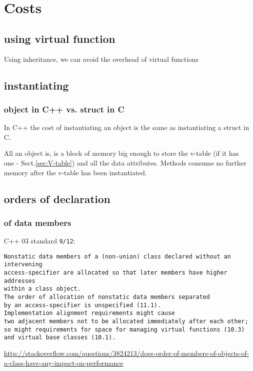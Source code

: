 \chapter{Costs}


\section{using virtual function}
\label{sec:overhead-of-virtual-function}


Using inheritance, we can avoid the overhead of virtual functions


\section{instantiating}
\label{sec:overhead-of-instantiating}

\subsection{object in C++ vs. struct in C}
\label{sec:overhead-of-instantiating-object_in_C++-vs_struct_in_C}

In C++ the cost of instantiating an object is the same as instantiating a struct
in C.

All an object is, is a block of memory big enough to store the v-table (if it
has one - Sect.\ref{sec:V-table}) and all the data attributes. Methods consume
no further memory after the v-table has been instantiated.

\section{orders of declaration}
\label{sec:overhead-of-order-of-declaration}


\subsection{of data members}
\label{sec:overhead-of-order-of-declaration-data-members}

C++ 03 standard \verb!9/12!:
\begin{verbatim}
Nonstatic data members of a (non-union) class declared without an intervening
access-specifier are allocated so that later members have higher addresses 
within a class object. 
The order of allocation of nonstatic data members separated 
by an access-specifier is unspecified (11.1). 
Implementation alignment requirements might cause 
two adjacent members not to be allocated immediately after each other; 
so might requirements for space for managing virtual functions (10.3) 
and virtual base classes (10.1).
\end{verbatim}
\url{http://stackoverflow.com/questions/3824213/does-order-of-members-of-objects-of-a-class-have-any-impact-on-performance}

